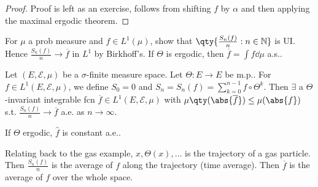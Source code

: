 \begin{proof}
	Proof is left as an exercise, follows from shifting $f$ by $\alpha$ and then applying the maximal ergodic theorem.
\end{proof}

\begin{exercise}
	For $\mu$ a prob measure and $f \in L^1(\mu)$, show that $\qty{\frac{S_n(f)}{n} : n \in \mathbb{N}}$ is UI.
	Hence $\frac{S_n(f)}{n} \to \overline f$ in $L^1$ by Birkhoff's.
	If $\Theta$ is ergodic, then $\overline f = \int f \dd{\mu}$ a.s..
\end{exercise}

\begin{theorem}
	Let $(E, \mathcal E, \mu)$ be a $\sigma$-finite measure space.
	Let $\Theta \colon E \to E$ be m.p..
	For $f \in L^1(E, \mathcal{E}, \mu)$, we define $S_0 = 0$ and $S_n = S_n(f) = \sum_{k=0}^{n-1} f \circ \Theta^k$.
	Then $\exists$ a $\Theta$-invariant integrable fcn $\overline f \in L^1(E, \mathcal{E}, \mu)$ with $\mu\qty(\abs{\overline f}) \leq \mu(\abs{f})$ s.t. $\frac{S_n(f)}{n} \to \overline f$ a.e. as $n \to \infty$.
\end{theorem}

\begin{remark}
	If $\Theta$ ergodic, $\hat{f}$ is constant a.e..

	Relating back to the gas example, $x, \Theta(x), \dots$ is the trajectory of a gas particle.
	Then $\frac{S_n(f)}{n}$ is the average of $f$ along the trajectory (time average).
	Then $\overline f$ is the average of $f$ over the whole space.
\end{remark}

